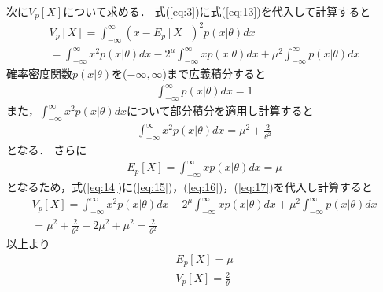 \documentclass[uplatex,b5j]{jsarticle} %
\begin{document}
次に$V_p[X]$について求める．
式(\ref{eq:3})に式(\ref{eq:13})を代入して計算すると
\begin{eqnarray}
    V_p[X]=\int_{-\infty}^{\infty}(x-E_p[X])^2p(x|\theta)dx \\ \nonumber
    = \int_{-\infty}^{\infty}x^2p(x|\theta) dx - 2^\mu\int_{-\infty}^{\infty}xp(x|\theta) dx + \mu^2\int_{-\infty}^{\infty}p(x|\theta) dx \label{eq:14}
\end{eqnarray}
確率密度関数$p(x|\theta)$を($-\infty, \infty$)まで広義積分すると
\begin{eqnarray}
    \int_{-\infty}^{\infty}p(x|\theta) dx = 1 \label{eq:15}
\end{eqnarray}
また，$\int_{-\infty}^{\infty}x^2p(x|\theta) dx$について部分積分を適用し計算すると
\begin{eqnarray}
    \int_{-\infty}^{\infty}x^2p(x|\theta) dx = \mu^2 + \frac{2}{\theta^2} \label{eq:16}
\end{eqnarray}
となる．
さらに
\begin{eqnarray}
    E_p[X] = \int_{-\infty}^{\infty}xp(x|\theta) dx = \mu \label{eq:17}
\end{eqnarray}
となるため，式(\ref{eq:14})に(\ref{eq:15})，(\ref{eq:16})，(\ref{eq:17})を代入し計算すると
\begin{eqnarray}
    V_p[X]=\int_{-\infty}^{\infty}x^2p(x|\theta) dx - 2^\mu\int_{-\infty}^{\infty}xp(x|\theta) dx + \mu^2\int_{-\infty}^{\infty}p(x|\theta) dx \\ \nonumber
    = \mu^2 + \frac{2}{\theta^2} - 2\mu^2 + \mu^2 = \frac{2}{\theta^2} \label{eq:18}
\end{eqnarray}
以上より
\begin{eqnarray}\label{eq:19}
    E_p[X] = \mu \\ \nonumber
    V_p[X] = \frac{2}{\theta}
\end{eqnarray}
\end{document}

